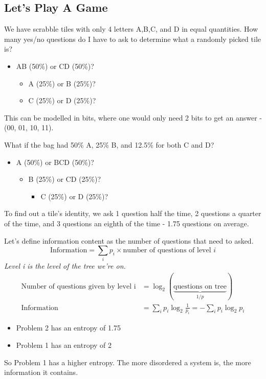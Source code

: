 \documentclass[a4paper, 11pt, normalem]{report}
\begin{document}
\subsection{Let's Play A Game}
\begin{example}
    We have scrabble tiles with only 4 letters A,B,C, and D in equal quantities. 
    How many yes/no questions do I have to ask to determine what a randomly picked tile is?
    \begin{itemize}
        \item AB (50\%) or CD (50\%)?
            \begin{itemize}
                \item A (25\%) or B (25\%)?
                \item C (25\%) or D (25\%)?
            \end{itemize}
    \end{itemize}
    This can be modelled in bits, where one would only need 2 bits to get an answer - (00, 01, 10, 11).

    What if the bag had 50\% A, 25\% B, and 12.5\% for both C and D?
    \begin{itemize}
        \item A (50\%) or BCD (50\%)?
            \begin{itemize}
                \item B (25\%) or CD (25\%)?
                    \begin{itemize}
                        \item C (25\%) or D (25\%)?
                    \end{itemize}
            \end{itemize}
    \end{itemize}
    To find out a tile's identity, we ask 1 question half the time, 2 questions a quarter of the time, and 3 questions an eighth of the time - 1.75 questions on average. 

    Let's define information content as the number of questions that need to asked. 
    \begin{equation}
        \text{Information} = \sum_i p_i \times \text{number of questions of level }i
    \end{equation}
    \emph{Level i is the level of the tree we're on.}
    \begin{align}
        \text{Number of questions given by level i} &= \log_2(\underbrace{\text{questions on tree}}_{1/p}) \\
        \text{Information} &= \sum_i p_i\log_2\frac{1}{p_i} = -\sum_i p_i\log_2p_i
    \end{align}
    \begin{itemize}
        \item Problem 2 has an entropy of 1.75
        \item Problem 1 has an entropy of 2
    \end{itemize}
    So Problem 1 has a higher entropy. 
    The more disordered a system is, the more information it contains. 


\end{example}
\end{document}
